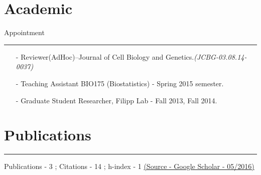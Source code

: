 \documentclass[line,margin]{cv_type2}
\newcommand{\changeurlcolor}[1]{\hypersetup{urlcolor=#1}}
\begin{document}
\begin{resume}
\section{Academic} \hskip 62pt {\large \sc Appointment} \hskip 4pt {\color {gray} \hfill \rule {12cm} {0.1pt}}
\begin{itemize}
\end{itemize} 
                \begin{itemize}
                \item[- ] 
                 {Reviewer(AdHoc)}--Journal of Cell Biology and Genetics.{\it \small{(JCBG-03.08.14-0037)}}
                \item[- ] 
                 Teaching Assistant BIO175 (Biostatistics) - Spring 2015 semester.
                \item[- ] 
                 Graduate Student Researcher, Filipp Lab - Fall 2013, Fall 2014.
\end{itemize}
                \vskip 10pt
                
\section{Publications} \hskip 4pt {\color {gray} \hfill \rule {14.2cm} {0.1pt}}
\begin{itemize}
                     {\color{gray} {\small{{Publications - 3 ;} \hskip 10pt {Citations - 14 ;} \hskip 10pt {h-index - 1} \hskip 10pt \changeurlcolor{gray}\href{https://scholar.google.com/citations?user=BA0Buh0AAAAJ&hl=en}{(Source - Google Scholar - 05/2016)}}}}
                     \end{itemize}
                     


\end{resume}
\end{document}
